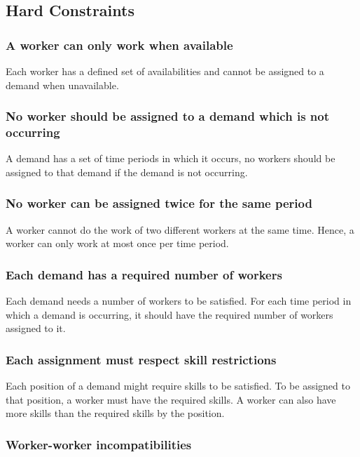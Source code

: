 \documentclass[../thesis.tex]{subfiles}
\begin{document}
\subsection{Hard Constraints}

\subsubsection{A worker can only work when available}

Each worker has a defined set of availabilities and cannot be assigned to a demand when 
unavailable.

\subsubsection{No worker should be assigned to a demand which is not occurring}

A demand has a set of time periods in which it occurs,
no workers should be assigned to that demand if the demand is not 
occurring.

\subsubsection{No worker can be assigned twice for the same period} 
A worker cannot do the work of two different workers at the same time.
Hence, a worker can only work at most once per time period.

\subsubsection{Each demand has a required number of workers}

Each demand needs a number of workers to be satisfied. 
For each time period in which a demand is occurring, it should have the required 
number of workers assigned to it.

\subsubsection{Each assignment must respect skill restrictions}

Each position of a demand might require skills to be satisfied. 
To be assigned to that position, a worker must have the required skills. 
A worker can also have more skills than the required skills by the position.

\subsubsection{Worker-worker incompatibilities}
\end{document}
